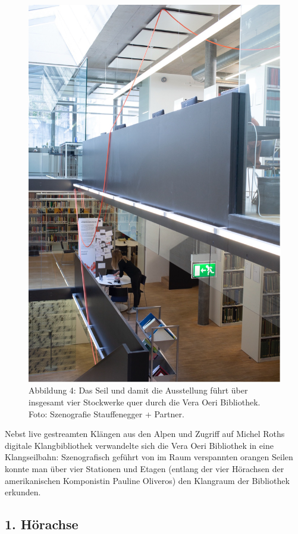 \documentclass[a4paper,
fontsize=11pt,
oneside,
numbers=noperiodatend,
parskip=half-,
bibliography=totoc,
final
]{scrartcl}
\begin{document}
\begin{figure}[H]
\centering
\includegraphics{img/Abb4.jpg}
\caption{Abbildung 4: Das Seil und damit die Ausstellung führt über
insgesamt vier Stockwerke quer durch die Vera Oeri Bibliothek. Foto:
Szenografie Stauffenegger + Partner.}
\end{figure}

Nebst live gestreamten Klängen aus den Alpen und Zugriff auf Michel
Roths digitale Klangbibliothek verwandelte sich die Vera Oeri Bibliothek
in eine Klangseilbahn: Szenografisch geführt von im Raum verspannten
orangen Seilen konnte man über vier Stationen und Etagen (entlang der
vier Hörachsen der amerikanischen Komponistin Pauline Oliveros) den
Klangraum der Bibliothek erkunden.

\hypertarget{huxf6rachse}{%
\subsection{1. Hörachse}\label{huxf6rachse}}
\end{document}
